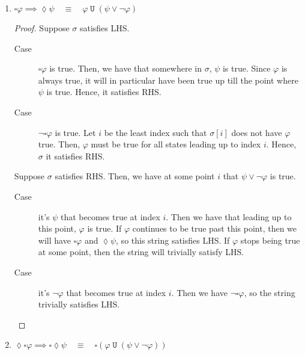 \documentclass[letterpaper,11pt]{article}
\newcommand{\eventually}{\lozenge}
\newcommand{\always}{\square}
\DeclareMathOperator{\untilOp}{\mathtt{U}}
\newcommand{\until}{\untilOp{}}
\newcommand{\parens}[1]{\left(#1\right)}
\newcommand{\enumalpha}{\renewcommand\labelenumi{(\alph{enumi})}}
\newcommand{\quadequiv}{\quad \equiv \quad}
\begin{document}
\begin{enumerate}
        \enumalpha
    \item
        $
        \always \varphi \implies \eventually \psi
        \quadequiv
        \varphi \until \parens{\psi \lor \neg \varphi}
        $

        \begin{proof}
            Suppose $\sigma$ satisfies LHS.
            \begin{description}
                \item[Case] $\always \varphi$ is true. Then, we have that
                    somewhere in $\sigma$, $\psi$ is true. Since $\varphi$ is
                    always true, it will in particular have been true up till
                    the point where $\psi$ is true. Hence, it satisfies RHS.
                \item[Case] $\neg \always \varphi$ is true. Let $i$ be the
                    least index such that $\sigma[i]$ does not have $\varphi$
                    true. Then, $\varphi$ must be true for all states leading
                    up to index $i$. Hence, $\sigma$ it satisfies RHS.
            \end{description}

            Suppose $\sigma$ satisfies RHS. Then, we have at some point $i$
            that $\psi \lor \neg \varphi$ is true.
            \begin{description}
                \item[Case] it's $\psi$ that becomes true at index $i$. Then we
                    have that leading up to this point, $\varphi$ is true. If
                    $\varphi$ continues to be true past this point, then we
                    will have $\always \varphi$ and $\eventually \psi$, so this
                    string satisfies LHS. If $\varphi$ stops being true at
                    some point, then the string will trivially satisfy LHS.

                \item[Case] it's $\neg \varphi$ that becomes true at index
                    $i$. Then we have $\neg \always \varphi$, so the string
                    trivially satisfies LHS.
            \end{description}
        \end{proof}

    \item
        $
        \eventually \always \varphi \implies \always \eventually \psi
        \quadequiv
        \always\parens{
            \varphi \until \parens{
                \psi \lor \neg \varphi
            }
        }
        $


\end{enumerate}
\end{document}
